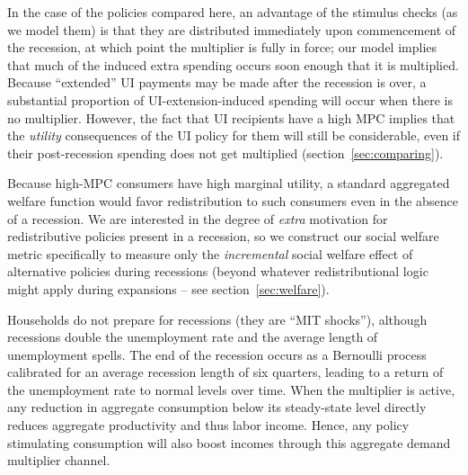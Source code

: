 \documentclass[\econtexRoot/HAFiscal]{subfiles}
\begin{document}
In the case of the policies compared here, an advantage of the stimulus checks (as we model them) is that they are distributed immediately upon commencement of the recession, at which point the multiplier is fully in force; our model implies that much of the induced extra spending occurs soon enough that it is multiplied.  Because ``extended'' UI payments may be made after the recession is over, a substantial proportion of UI-extension-induced spending will occur when there is no multiplier.  However, the fact that UI recipients have a high MPC implies that the \textit{utility} consequences of the UI policy for them will still be considerable, even if their post-recession spending does not get multiplied (section~\ref{sec:comparing}).

Because high-MPC consumers have high marginal utility, a standard aggregated welfare function would favor redistribution to such consumers even in the absence of a recession. We are interested in the degree of \textit{extra} motivation for redistributive policies present in a recession, so we construct our social welfare metric specifically to measure only the \textit{incremental} social welfare effect of alternative policies during recessions (beyond whatever redistributional logic might apply during expansions -- see section~\ref{sec:welfare}).


Households do not prepare for recessions (they are ``MIT shocks''), although recessions double the unemployment rate and the average length of unemployment spells. The end of the recession occurs as a Bernoulli process calibrated for an average recession length of six quarters, leading to a return of the unemployment rate to normal levels over time. When the multiplier is active, any reduction in aggregate consumption below its steady-state level directly reduces aggregate productivity and thus labor income. Hence, any policy stimulating consumption will also boost incomes through this aggregate demand multiplier channel.

\end{document}
